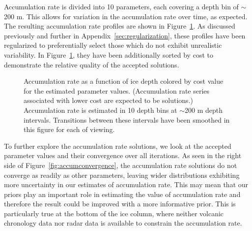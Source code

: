 Accumulation rate is divided into 10 parameters, each covering a depth bin of $\sim$200 m. This allows for variation in the accumulation rate over time, as expected. The resulting accumulation rate profiles are shown in Figure~\ref{fig:accumdepth}. As discussed previously and further in Appendix~\ref{sec:regularization}, these profiles have been regularized to preferentially select those which do not exhibit unrealistic variability. In Figure~\ref{fig:accumdepth}, they have been additionally sorted by cost to demonstrate the relative quality of the accepted solutions.

\begin{figure}[ht]
\centering
{}
\caption[]{Accumulation rate as a function of ice depth colored by cost value for the estimated parameter values. (Accumulation rate series associated with lower cost are expected to be solutions.) Accumulation rate is estimated in 10 depth bins at $\sim$200 m depth intervals. Transitions between these intervals have been smoothed in this figure for each of viewing.}
\label{fig:accumdepth}
\end{figure}

To further explore the accumulation rate solutions, we look at the accepted parameter values and their convergence over all iterations. As seen in the right side of Figure~\ref{fig:accumconvergence}, the accumulation rate solutions do not converge as readily as other parameters, leaving wider distributions exhibiting more uncertainty in our estimates of accumulation rate. This may mean that our priors play an important role in estimating the value of accumulation rate and therefore the result could be improved with a more informative prior. This is particularly true at the bottom of the ice column, where neither volcanic chronology data nor radar data is available to constrain the accumulation rate.

